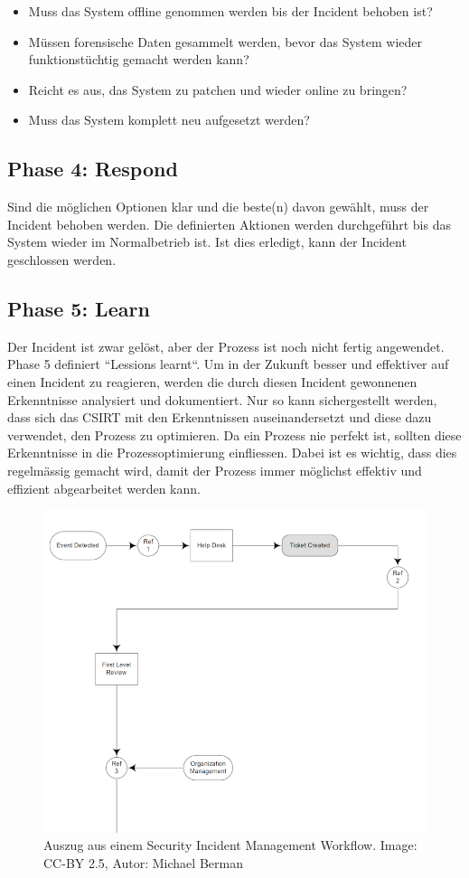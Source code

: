 \begin{itemize}
\item Muss das System offline genommen werden bis der Incident behoben ist?
\item Müssen forensische Daten gesammelt werden, bevor das System wieder funktionstüchtig gemacht werden kann?
\item Reicht es aus, das System zu patchen und wieder online zu bringen?
\item Muss das System komplett neu aufgesetzt werden?
\end{itemize}

\subsection{Phase 4: Respond}
Sind die möglichen Optionen klar und die beste(n) davon gewählt, muss der Incident behoben werden. Die definierten Aktionen werden durchgeführt bis das System wieder im Normalbetrieb ist. Ist dies erledigt, kann der Incident geschlossen werden.

\subsection{Phase 5: Learn}
Der Incident ist zwar gelöst, aber der Prozess ist noch nicht fertig angewendet. Phase 5 definiert ``Lessions learnt``. Um in der Zukunft besser und effektiver auf einen Incident zu reagieren, werden die durch diesen Incident gewonnenen Erkenntnisse analysiert und dokumentiert. Nur so kann sichergestellt werden, dass sich das CSIRT mit den Erkenntnissen auseinandersetzt und diese dazu verwendet, den Prozess zu optimieren. Da ein Prozess nie perfekt ist, sollten diese Erkenntnisse in die Prozessoptimierung einfliessen. Dabei ist es wichtig, dass dies regelmässig gemacht wird, damit der Prozess immer möglichst effektiv und effizient abgearbeitet werden kann.

\begin{figure}
  \includegraphics[width=\textwidth]{SIMExample}
    \caption{Auszug aus einem Security Incident Management Workflow. Image: CC-BY 2.5, Autor: Michael Berman}
    \label{fig:SIMExample}          
\end{figure}

